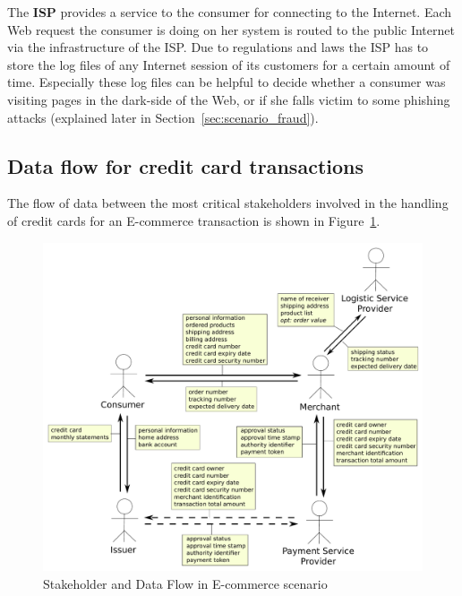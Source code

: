 The \textbf{ISP} provides a service to the consumer for connecting to the Internet. Each Web request the consumer is doing on her system is routed to the public Internet via the infrastructure of the \gls{ISP}. Due to regulations and laws the \gls{ISP} has to store the log files of any Internet session of its customers for a certain amount of time. Especially these log files can be helpful to decide whether a consumer was visiting pages in the dark-side of the Web, or if she falls victim to some phishing attacks (explained later in Section~\ref{sec:scenario_fraud}).


\subsection{Data flow for credit card transactions}
\label{subsec:stakeholder_data_flow}

The flow of data between the most critical stakeholders involved in the handling of credit cards for an E-commerce transaction is shown in Figure~\ref{fig:images_e_commerce_stakeholder}. \@

\begin{figure}[H]
	\centering
		\includegraphics[width=0.8\columnwidth]{images/e-commerce-stakeholder.pdf}
	\caption{Stakeholder and Data Flow in E-commerce scenario}
\label{fig:images_e_commerce_stakeholder}
\end{figure}


